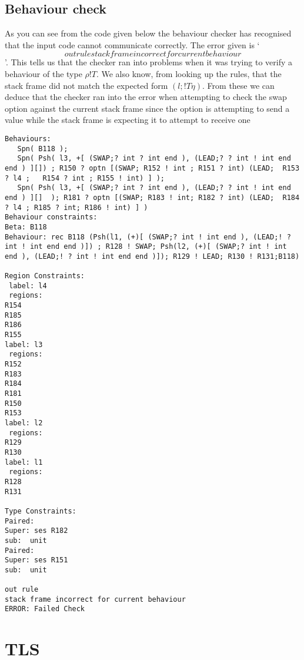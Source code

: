 \subsection{Behaviour check}

As you can see from the code given below the behaviour checker has recognised that the input code cannot communicate correctly. The error given is `$$out rule stack frame incorrect for current behaviour$$'. This tells us that the checker ran into problems when it was trying to verify a behaviour of the type $\rho!T$. We also know, from looking up the rules, that the stack frame did not match the expected form $(l; !T\eta)$. From these we can deduce that the checker ran into the error when attempting to check the swap option against the current stack frame since the option is attempting to send a value while the stack frame is expecting it to attempt to receive one 

\begin{lstlisting}
Behaviours:
   Spn( B118 );
   Spn( Psh( l3, +[ (SWAP;? int ? int end ), (LEAD;? ? int ! int end end ) ][]) ; R150 ? optn [(SWAP; R152 ! int ; R151 ? int) (LEAD;  R153 ? l4 ;   R154 ? int ; R155 ! int) ] );  
   Spn( Psh( l3, +[ (SWAP;? int ? int end ), (LEAD;? ? int ! int end end ) ][]  ); R181 ? optn [(SWAP; R183 ! int; R182 ? int) (LEAD;  R184 ? l4 ; R185 ? int; R186 ! int) ] )
Behaviour constraints:
Beta: B118 
Behaviour: rec B118 (Psh(l1, (+)[ (SWAP;? int ! int end ), (LEAD;! ? int ! int end end )]) ; R128 ! SWAP; Psh(l2, (+)[ (SWAP;? int ! int end ), (LEAD;! ? int ! int end end )]); R129 ! LEAD; R130 ! R131;B118)

Region Constraints:
 label: l4
 regions:
R154
R185
R186
R155
label: l3
 regions:
R152
R183
R184
R181
R150
R153
label: l2
 regions:
R129
R130
label: l1
 regions:
R128
R131

Type Constraints:
Paired: 
Super: ses R182 
sub:  unit 
Paired: 
Super: ses R151
sub:  unit 

out rule
stack frame incorrect for current behaviour
ERROR: Failed Check
\end{lstlisting}

\FloatBarrier
\section{TLS}

